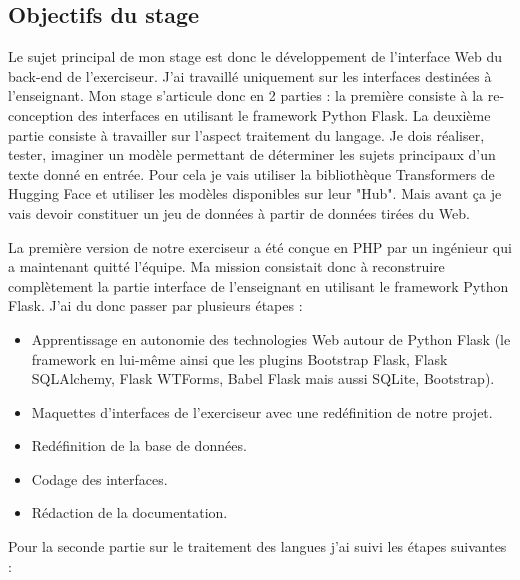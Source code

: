 \documentclass[12pt]{article}
\begin{document}
\subsection{Objectifs du stage}

Le sujet principal de mon stage est donc le développement de l'interface Web du back-end de l'exerciseur. J'ai travaillé uniquement sur les interfaces destinées à l'enseignant. 
Mon stage s’articule donc en 2 parties : la première consiste à la re-conception des interfaces en utilisant le framework Python Flask. La deuxième partie consiste à travailler sur l’aspect traitement du langage. Je dois réaliser, tester, imaginer un modèle permettant de déterminer les sujets principaux d'un texte donné en entrée. Pour cela je vais utiliser la bibliothèque Transformers de Hugging Face et utiliser les modèles disponibles sur leur "Hub". Mais avant ça je vais devoir constituer un jeu de données à partir de données tirées du Web.

La première version de notre exerciseur a été conçue en PHP par un ingénieur qui a maintenant quitté l’équipe. Ma mission consistait donc à reconstruire complètement la partie interface de l’enseignant en utilisant le framework Python Flask. J’ai du donc passer par plusieurs étapes : 

\begin{itemize}


    \item Apprentissage en autonomie des technologies Web autour de Python Flask (le framework en lui-même ainsi que les plugins Bootstrap Flask, Flask SQLAlchemy, Flask WTForms, Babel Flask mais aussi SQLite, Bootstrap).
    
    \item Maquettes d'interfaces de l’exerciseur avec une redéfinition de notre projet.
    
    \item Redéfinition de la base de données. 
    
    \item Codage des interfaces.
    
    \item Rédaction de la documentation.
    
\end{itemize}

Pour la seconde partie sur le traitement des langues j'ai suivi les étapes suivantes :
\end{document}
